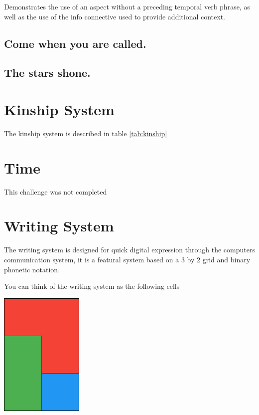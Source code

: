 


Demonstrates the use of an aspect without a preceding temporal verb phrase, as well as the use of the info connective used to provide additional context.

\subsection*{Come when you are called.}




\subsection*{The stars shone.}




\section{Kinship System}

The kinship system is described in table \ref{tab:kinship}

\section{Time}

This challenge was not completed

\section{Writing System}

The writing system is designed for quick digital expression through the computers communication system, it is a featural system based on a 3 by 2 grid and binary phonetic notation. 

You can think of the writing system as the following cells

\begin{center}
\includegraphics[width=0.3\textwidth]{images/orthog}
\end{center}

